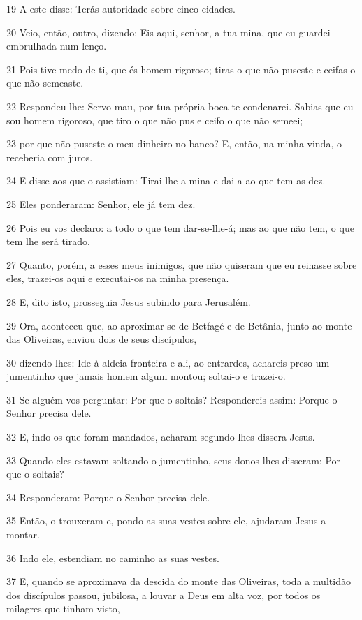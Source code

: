 \par 19 A este disse: Terás autoridade sobre cinco cidades.
\par 20 Veio, então, outro, dizendo: Eis aqui, senhor, a tua mina, que eu guardei embrulhada num lenço.
\par 21 Pois tive medo de ti, que és homem rigoroso; tiras o que não puseste e ceifas o que não semeaste.
\par 22 Respondeu-lhe: Servo mau, por tua própria boca te condenarei. Sabias que eu sou homem rigoroso, que tiro o que não pus e ceifo o que não semeei;
\par 23 por que não puseste o meu dinheiro no banco? E, então, na minha vinda, o receberia com juros.
\par 24 E disse aos que o assistiam: Tirai-lhe a mina e dai-a ao que tem as dez.
\par 25 Eles ponderaram: Senhor, ele já tem dez.
\par 26 Pois eu vos declaro: a todo o que tem dar-se-lhe-á; mas ao que não tem, o que tem lhe será tirado.
\par 27 Quanto, porém, a esses meus inimigos, que não quiseram que eu reinasse sobre eles, trazei-os aqui e executai-os na minha presença.
\par 28 E, dito isto, prosseguia Jesus subindo para Jerusalém.
\par 29 Ora, aconteceu que, ao aproximar-se de Betfagé e de Betânia, junto ao monte das Oliveiras, enviou dois de seus discípulos,
\par 30 dizendo-lhes: Ide à aldeia fronteira e ali, ao entrardes, achareis preso um jumentinho que jamais homem algum montou; soltai-o e trazei-o.
\par 31 Se alguém vos perguntar: Por que o soltais? Respondereis assim: Porque o Senhor precisa dele.
\par 32 E, indo os que foram mandados, acharam segundo lhes dissera Jesus.
\par 33 Quando eles estavam soltando o jumentinho, seus donos lhes disseram: Por que o soltais?
\par 34 Responderam: Porque o Senhor precisa dele.
\par 35 Então, o trouxeram e, pondo as suas vestes sobre ele, ajudaram Jesus a montar.
\par 36 Indo ele, estendiam no caminho as suas vestes.
\par 37 E, quando se aproximava da descida do monte das Oliveiras, toda a multidão dos discípulos passou, jubilosa, a louvar a Deus em alta voz, por todos os milagres que tinham visto,
